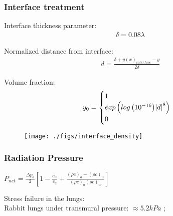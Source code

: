 \begin{frame}\frametitle{\vspace*{0.5cm}Interface treatment}
  {\small
    \begin{minipage}{0.55\textwidth}
      Interface thickness parameter:
      \begin{align*}
        \delta = 0.08\lambda%
      \end{align*}
      
      Normalized distance from interface:
      \begin{align*}
        d = \frac{\delta +y(x)_{interface} -y}{2\delta}
      \end{align*}


      Volume fraction:%
      \begin{align*}
        y_0 = %
        \begin{cases}
          1\\%
          exp\left(log\left(10^{-16}\right)\abs{d}^8\right)\\%
          0%
        \end{cases}%
      \end{align*}
    \end{minipage}
    \begin{minipage}{0.4\textwidth}
      \begin{figure}
        \centering
        \texttt{[image: ./figs/interface\_density]}
      \end{figure}
    \end{minipage}
  }
\end{frame}

\begin{frame}\frametitle{Radiation Pressure}
  $P_{net}=\frac{\Delta p_a}{2}\left[1-\frac{c_w}{c_a}+\frac{(\rho c)_a-(\rho c)_w}{(\rho c)_a(\rho c)_w}\right]$ \cite{Beyer1974}
  

  Stress failure in the lungs:\\
  Rabbit lungs under transmural pressure: $\approx 5.2 kPa$ \citep{West1991};

  
  
  
\end{frame}


